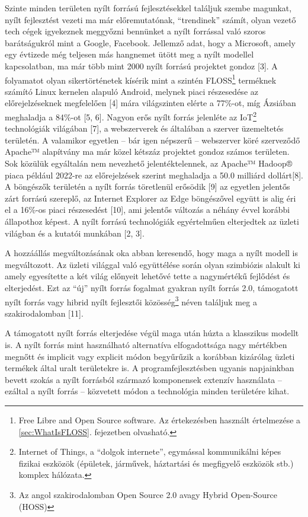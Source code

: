 \documentclass[12pt,magyar,a4paper,oneside]{scrreprt}
\begin{document}
Szinte minden területen nyílt forrású fejlesztésekkel találjuk szembe
magunkat, nyílt fejlesztést vezeti ma már előremutatónak, ``trendinek''
számít, olyan vezető tech cégek igyekeznek meggyőzni bennünket a nyílt
forrással való szoros barátságukról mint a Google, Facebook. Jellemző
adat, hogy a Microsoft, amely egy évtizede még teljesen más hangnemet
ütött meg a nyílt modellel kapcsolatban, ma már több mint 2000 nyílt
forrású projektet gondoz {[}3{]}. A folyamatot olyan sikertörténetek
kísérik mint a szintén FLOSS\footnote{Free Libre and Open Source
  software. Az értekezésben használt értelmezése a
  \ref{sec:WhatIsFLOSS}. fejezetben olvasható.} terméknek számító Linux
kernelen alapuló Android, melynek piaci részesedése az előrejelzéseknek
megfelelően {[}4{]} mára világszinten elérte a 77\%-ot, míg Ázsiában
meghaladja a 84\%-ot {[}5, 6{]}. Nagyon erős nyílt forrás jelenléte az
IoT\footnote{Internet of Things, a ``dolgok internete'', egymással
  kommunikálni képes fizikai eszközök (épületek, járművek, háztartási és
  megfigyelő eszközök stb.) komplex hálózata.} technológiák világában
{[}7{]}, a webszerverek és általában a szerver üzemeltetés területén. A
valamikor egyetlen -- bár igen népszerű -- webszerver köré szerveződő
Apache™ alapítvány ma már közel kétszáz projektet gondoz számos
területen. Sok közülük egyáltalán nem nevezhető jelentéktelennek, az
Apache™ Hadoop® piaca például 2022-re az előrejelzések szerint
meghaladja a 50.0 milliárd dollárt{[}8{]}. A böngészők területén a nyílt
forrás töretlenül erősödik {[}9{]} az egyetlen jelentős zárt forrású
szereplő, az Internet Explorer az Edge böngészővel együtt is alig éri el
a 16\%-os piaci részesedést {[}10{]}, ami jelentős változás a néhány
évvel korábbi állapothoz képest. A nyílt forrású technológiák
egyértelműen elterjedtek az üzleti világban és a kutatói munkában {[}2,
3{]}.

A hozzáállás megváltozásának oka abban keresendő, hogy maga a nyílt
modell is megváltozott. Az üzleti világgal való együttélése során olyan
szimbiózis alakult ki amely egyesítette a két világ előnyeit lehetővé
tette a nagymértékű fejlődést és elterjedést. Ezt az ``új'' nyílt forrás
fogalmat gyakran nyílt forrás 2.0, támogatott nyílt forrás vagy hibrid
nyílt fejlesztői közösség\footnote{Az angol szakirodalomban Open Source
  2.0 avagy Hybrid Open-Source (HOSS)} néven találjuk meg a
szakirodalomban {[}11{]}.

A támogatott nyílt forrás elterjedése végül maga után húzta a klasszikus
modellt is. A nyílt forrás mint használható alternatíva elfogadottsága
nagy mértékben megnőtt és implicit vagy explicit módon begyűrűzik a
korábban kizárólag üzleti termékek által uralt területekre is. A
programfejlesztésben ugyanis napjainkban bevett szokás a nyílt forrásból
származó komponensek extenzív használata -- ezáltal a nyílt forrás --
közvetett módon a technológia minden területére kihat.
\end{document}
